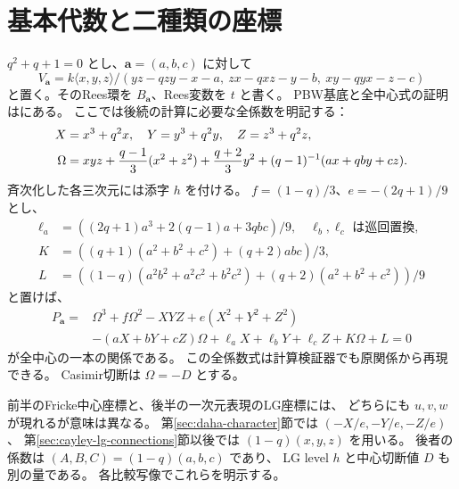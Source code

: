 \documentclass[11pt,a4paper]{ltjsarticle}
\begin{document}
\tableofcontents
\section{基本代数と二種類の座標}\label{sec:quantum-center-data}
$q^2+q+1=0$ とし、$\mathbf a=(a,b,c)$ に対して
\[
 V_{\mathbf a}=k\langle x,y,z\rangle/
 (yz-qzy-x-a,\ zx-qxz-y-b,\ xy-qyx-z-c)
\]
と置く。そのRees環を $B_{\mathbf a}$、Rees変数を $t$ と書く。
PBW基底と全中心式の証明は\cite[三乗根包絡と中心三次切断]{CompanionE6}にある。
ここでは後続の計算に必要な全係数を明記する：
\begin{align}
 X&=x^3+q^2x,\quad Y=y^3+q^2y,\quad Z=z^3+q^2z,\notag\\
 \Omega&=xyz+\frac{q-1}{3}(x^2+z^2)+\frac{q+2}{3}y^2
 +(q-1)^{-1}(ax+qby+cz).\label{eq:Omega}
\end{align}
斉次化した各三次元には添字 $h$ を付ける。
$f=(1-q)/3$、$e=-(2q+1)/9$ とし、
\begin{align*}
 \ell_a&=((2q+1)a^3+2(q-1)a+3qbc)/9,\quad \ell_b,\ell_c\text{ は巡回置換},\\
 K&=((q+1)(a^2+b^2+c^2)+(q+2)abc)/3,\\
 L&=((1-q)(a^2b^2+a^2c^2+b^2c^2)+(q+2)(a^2+b^2+c^2))/9
\end{align*}
と置けば、
\begin{equation}\label{eq:center}
\begin{split}
 P_{\mathbf a}={}&\Omega^3+f\Omega^2-XYZ+e(X^2+Y^2+Z^2)\\
 &-(aX+bY+cZ)\Omega+\ell_aX+\ell_bY+\ell_cZ+K\Omega+L=0
\end{split}
\end{equation}
が全中心の一本の関係である。
この全係数式は計算検証器でも原関係から再現できる。
Casimir切断は $\Omega=-D$ とする。

前半のFricke中心座標と、後半の一次元表現のLG座標には、
どちらにも $u,v,w$ が現れるが意味は異なる。
第\ref{sec:daha-character}節では $(-X/e,-Y/e,-Z/e)$、
第\ref{sec:cayley-lg-connections}節以後では $(1-q)(x,y,z)$ を用いる。
後者の係数は $(A,B,C)=(1-q)(a,b,c)$ であり、
LG level $h$ と中心切断値 $D$ も別の量である。
各比較写像でこれらを明示する。











\end{document}
